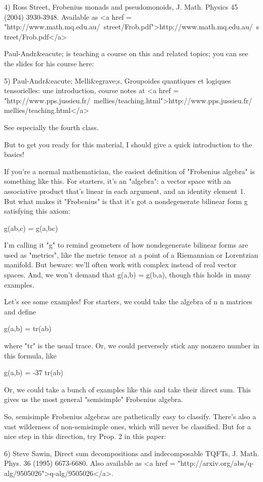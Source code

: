 4) Ross Street, Frobenius monads and pseudomonoids, J. Math. Physics 
45 (2004) 3930-3948.  Available as 
<a href = "http://www.math.mq.edu.au/~street/Frob.pdf">http://www.math.mq.edu.au/~street/Frob.pdf</a>

Paul-Andr&eacute; is teaching a course on this and related topics;
you can see the slides for his course here:

5) Paul-Andr&eacute; Melli&egrave;s, Groupoides quantiques et logiques
tensorielles: une introduction, course notes at <a href =
"http://www.pps.jussieu.fr/~mellies/teaching.html">http://www.pps.jussieu.fr/~mellies/teaching.html</a>

See especially the fourth class.  

But to get you ready for this material, I should give a quick
introduction to the basics!

If you're a normal mathematician, the easiest definition of
"Frobenius algebra" is something like this.  For starters, it's
an "algebra": a vector space with an associative product that's 
linear in each argument, and an identity element 1.  But what 
makes it "Frobenius" is that it's got a nondegenerate bilinear 
form g satisfying this axiom:

g(ab,c) = g(a,bc)

I'm calling it "g" to remind geometers of how nondegenerate
bilinear forms are used as "metrics", like the metric tensor
at a point of a Riemannian or Lorentzian manifold.  But beware: we'll
often work with complex instead of real vector spaces.  And, we won't
demand that g(a,b) = g(b,a), though this holds in many examples.

Let's see some examples!  For starters, we could take the algebra 
of n \times  n matrices and define

g(a,b) = tr(ab)

where "tr" is the usual trace.  Or, we could perversely stick
any nonzero number in this formula, like

g(a,b) = -37 tr(ab)

Or, we could take a bunch of examples like this and take their direct
sum.  This gives us the most general "semisimple" Frobenius
algebra.

So, semisimple Frobenius algebras are pathetically easy to classify.  
There's also a vast wilderness of non-semisimple ones, which will 
never be classified.  But for a nice step in this direction, 
try Prop. 2 in this paper:

6) Steve Sawin, Direct sum decompositions and indecomposable
TQFTs, J. Math. Phys. 36 (1995) 6673-6680.  Also available
as <a href = "http://arxiv.org/abs/q-alg/9505026">q-alg/9505026</a>.

